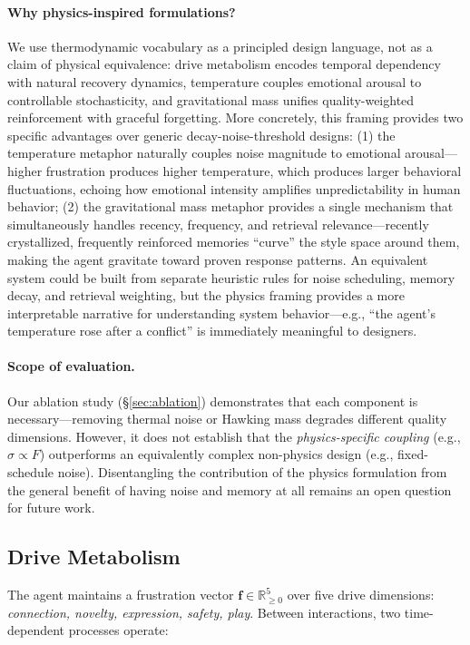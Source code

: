 \paragraph{Why physics-inspired formulations?} We use thermodynamic vocabulary as a principled design language, not as a claim of physical equivalence: drive metabolism encodes temporal dependency with natural recovery dynamics, temperature couples emotional arousal to controllable stochasticity, and gravitational mass unifies quality-weighted reinforcement with graceful forgetting. More concretely, this framing provides two specific advantages over generic decay-noise-threshold designs: (1) the temperature metaphor naturally couples noise magnitude to emotional arousal---higher frustration produces higher temperature, which produces larger behavioral fluctuations, echoing how emotional intensity amplifies unpredictability in human behavior; (2) the gravitational mass metaphor provides a single mechanism that simultaneously handles recency, frequency, and retrieval relevance---recently crystallized, frequently reinforced memories ``curve'' the style space around them, making the agent gravitate toward proven response patterns. An equivalent system could be built from separate heuristic rules for noise scheduling, memory decay, and retrieval weighting, but the physics framing provides a more interpretable narrative for understanding system behavior---e.g., ``the agent's temperature rose after a conflict'' is immediately meaningful to designers.

\paragraph{Scope of evaluation.} Our ablation study (\S\ref{sec:ablation}) demonstrates that each component is necessary---removing thermal noise or Hawking mass degrades different quality dimensions. However, it does not establish that the \emph{physics-specific coupling} (e.g., $\sigma \propto F$) outperforms an equivalently complex non-physics design (e.g., fixed-schedule noise). Disentangling the contribution of the physics formulation from the general benefit of having noise and memory at all remains an open question for future work.

\subsection{Drive Metabolism}

The agent maintains a frustration vector $\mathbf{f} \in \mathbb{R}^5_{\geq 0}$ over five drive dimensions: \emph{connection, novelty, expression, safety, play}. Between interactions, two time-dependent processes operate:

